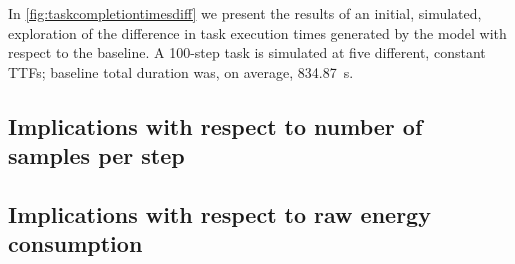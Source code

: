 In \cref{fig:taskcompletiontimesdiff} we present the results of an initial, simulated, exploration of the difference in task execution times generated by the model with respect to the baseline.
A \num{100}-step task is simulated at five different, constant \glspl{TTF}; baseline total duration was, on average, \SI{834.87}{\second}.


\subsection{Implications with respect to number of samples per step}

\subsection{Implications with respect to raw energy consumption}
